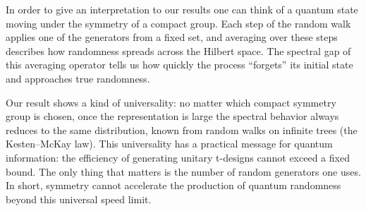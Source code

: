 \documentclass[11pt, a4paper]{article}
\theoremstyle{definition}
\theoremstyle{remark}
\begin{document}
In order to give an interpretation to our results one can think of a quantum state moving under the symmetry of a compact group. Each step of the random walk applies one of the generators from a fixed set, and averaging over these steps describes how randomness spreads across the Hilbert space. The spectral gap of this averaging operator tells us how quickly the process “forgets” its initial state and approaches true randomness.

Our result shows a kind of universality: no matter which compact symmetry group is chosen, once the representation is large the spectral behavior always reduces to the same distribution, known from random walks on infinite trees (the Kesten–McKay law). This universality has a practical message for quantum information: the efficiency of generating  unitary t-designs cannot exceed a fixed bound. The only thing that matters is the number of random generators one uses. In short, symmetry cannot accelerate the production of quantum randomness beyond this universal speed limit.
 



\end{document}

